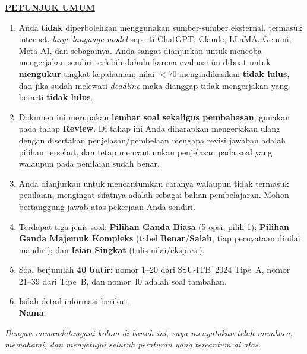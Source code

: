 \documentclass[11pt]{article}
\begin{document}
\noindent\textbf{\underline{PETUNJUK UMUM}}
\begin{enumerate}[leftmargin=*,itemsep=4pt,topsep=4pt]
  \item Anda \textbf{tidak} diperbolehkan menggunakan sumber-sumber eksternal,
        termasuk internet, \textit{large language model} seperti ChatGPT, Claude,
        LLaMA, Gemini, Meta AI, dan sebagainya. Anda sangat dianjurkan untuk
        mencoba mengerjakan sendiri terlebih dahulu karena evaluasi ini dibuat
        untuk \textbf{mengukur} tingkat kepahaman; nilai $<70$ mengindikasikan
        \textbf{tidak lulus}, dan jika sudah melewati \textit{deadline} maka
        dianggap tidak mengerjakan yang berarti \textbf{tidak lulus}.

  \item Dokumen ini merupakan \textbf{lembar soal sekaligus pembahasan}; gunakan
        pada tahap \textbf{Review}. Di tahap ini Anda diharapkan mengerjakan ulang
        dengan disertakan penjelasan/pembelaan mengapa revisi jawaban adalah pilihan
        tersebut, dan tetap mencantumkan penjelasan pada soal yang walaupun pada
        penilaian sudah benar.

  \item Anda dianjurkan untuk mencantumkan caranya walaupun tidak termasuk
        penilaian, mengingat sifatnya adalah sebagai bahan pembelajaran.
        Mohon bertanggung jawab atas pekerjaan Anda sendiri.

  \item Terdapat tiga jenis soal: \textbf{Pilihan Ganda Biasa} (5 opsi, pilih 1);
        \textbf{Pilihan Ganda Majemuk Kompleks} (tabel \textbf{Benar}/\textbf{Salah},
        tiap pernyataan dinilai mandiri); dan \textbf{Isian Singkat}
        (tulis nilai/ekspresi).

  \item Soal berjumlah \textbf{40 butir}: nomor 1--20 dari SSU-ITB~2024 Tipe~A,
        nomor 21--39 dari Tipe~B, dan nomor 40 adalah soal tambahan.

  \item Isilah detail informasi berikut.\\[0.3em]
        \textbf{Nama}\hspace{0.45cm};\enspace\underline{\hspace{8cm}}
\end{enumerate}

\vspace{0.6cm}
\noindent\textit{Dengan menandatangani kolom di bawah ini, saya menyatakan telah membaca,
memahami, dan menyetujui seluruh peraturan yang tercantum di atas.}
\end{document}
